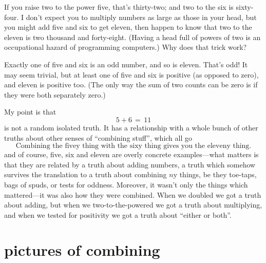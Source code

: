 \documentclass{book}
\begin{document}
If you raise two to the power five, that's thirty-two; and two to the six is sixty-four. I don't expect you to multiply numbers as large as those in your head, but you might add five and six to get eleven, then happen to know that two to the eleven is two thousand and forty-eight. (Having a head full of powers of two is an occupational hazard of programming computers.) Why does that trick work?

Exactly one of five and six is an odd number, and so is eleven. That's odd! It may seem trivial, but at least one of five and six is positive (as opposed to zero), and eleven is positive too. (The only way the sum of two counts can be zero is if they were both separately zero.)

My point is that
\[
5 + 6 \,=\, 11
\]
is not a random isolated truth. It has a relationship with a whole bunch of other truths about other senses of ``combining stuff'', which all go
\[
\mbox{Combining the fivey thing with the sixy thing gives you the eleveny thing.}
\]
and of course, five, six and eleven are overly concrete examples---what matters is that they are related by a truth about adding numbers, a truth which somehow survives the translation to a truth about combining $n$y things, be they toe-taps, bags of spuds, or tests for oddness. Moreover, it wasn't only the things which mattered---it was also how they were combined. When we doubled we got a truth about adding, but when we two-to-the-powered we got a truth about multiplying, and when we tested for positivity we got a truth about ``either or both''.


\section{pictures of combining}

\newcommand{\wye}[3]{\begin{array}[b]{@{}c@{}}\underbrace{\!\!#1\;\;#2\!\!}\\ #3\end{array}}
\newcommand{\wir}[2]{\begin{array}[b]{@{}c@{}}#1\\ \mid\\ #2\end{array}}
\newcommand{\wid}[1]{\wir{#1}{#1}}
\newcommand{\naw}[1]{\begin{array}[b]{@{}c@{}}\bullet \vspace*{-0.13in}\\ \mid \\ #1\end{array}}
\end{document}

